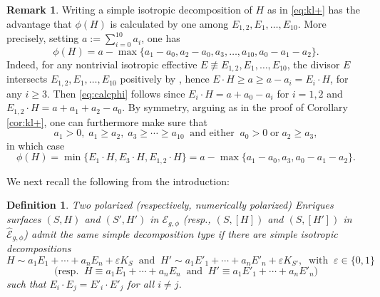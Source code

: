 \documentclass[11pt]{amsart}
\newtheorem{definition}[thm]{Definition}
\theoremstyle{definition}
\newtheorem{remark}[thm]{Remark}
\def\min{\operatorname{min}}
\def\max{\operatorname{max}}
\def\E{{\mathcal E}}
\begin{document}
\begin{remark} \label{rem:calcphi}
 Writing a simple isotropic decomposition of $H$ as in \eqref{eq:kl+} has the advantage that $\phi(H)$ is calculated by one among $E_{1,2},E_1,\ldots,E_{10}$. More precisely, setting $a:=\sum_{i=0}^{10}a_i$, one has
 \begin{equation}
   \label{eq:calcphi}
   \phi(H)= a - \max\{a_1-a_0,a_2-a_0,a_3,\ldots,a_{10},a_0-a_1-a_2\}.
 \end{equation}
Indeed, for any nontrivial isotropic effective $E \not \equiv
E_{1,2},E_1,\ldots,E_{10}$,
\color{black}
the divisor $E$ intersects  $E_{1,2},E_1,\ldots,E_{10}$ positively by \cite[Lemma~2.1]{klvan}, hence
\color{black}
$E \cdot H \geqslant a \geqslant a-a_i=E_i \cdot H$, for any $i \geqslant 3$. Then \eqref{eq:calcphi} follows since $E_i \cdot H=a+a_0-a_i$ for $i=1,2$
and $E_{1,2} \cdot H=a+a_1+a_2-a_0$. By symmetry, arguing as in the proof of Corollary \ref{cor:kl+},  one can furthermore make sure that 
\begin{equation}
   \label{eq:imp} a_1 >0, \; a_1 \geqslant a_2, \; a_3 \geqslant \cdots \geqslant a_{10} \; \; \mbox{and either} \; \; a_0 >0 \; \mbox{or} \; a_2 \geqslant a_3,
\end{equation}
in which case 
\begin{equation}
   \label{eq:calcphi2}
   \phi(H)= \min\{E_1 \cdot H, E_3 \cdot H, E_{1,2} \cdot H\}=a - \max\{a_1-a_0,a_
3,a_0-a_1-a_2\}.
 \end{equation}
\end{remark}







 We next recall the following from the introduction:

\begin{definition} \label{def:tutte2}
 Two polarized (respectively, numerically polarized) Enriques surfaces $(S,H)$ and $(S',H')$ in $\E_{g,\phi}$ (resp., $(S,[H])$ and $(S, [H'])$ in $\widehat{\E}_{g,\phi}$) {\em  admit the same  simple decomposition type} if there are simple isotropic decompositions
\[H \sim a_1 E_1+\cdots +a_nE_n+\varepsilon K_S
\; \; \mbox{and} \; \; H' \sim a_1 E'_1+\cdots +a_nE'_n+\varepsilon K_{S'}, \; \;  \mbox{with} \; \; \varepsilon  \in \{0,1\}\]
\[ \mbox {(resp.}\;\; H \equiv a_1 E_1+\cdots +a_nE_n
\; \; \mbox{and} \; \; H' \equiv a_1 E'_1+\cdots +a_nE'_n)\]
such that $E_i \cdot E_j=E'_i \cdot E'_j$ for all $i \neq j$.
\end{definition}
\end{document}
